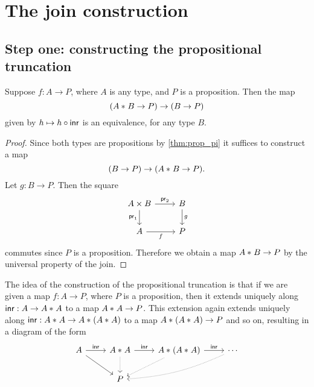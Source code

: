 \section{The join construction}
\subsection{Step one: constructing the propositional truncation}

\begin{lem}\label{lem:extend_join_prop}
Suppose $f:A\to P$, where $A$ is any type, and $P$ is a proposition.
Then the map
\begin{equation*}
({A}\ast_{}{B}\to P)\to (B\to P)
\end{equation*}
given by $h\mapsto h\circ {\mathsf{inr}}$ is an equivalence, for any type $B$.
\end{lem}

\begin{proof}
Since both types are propositions by \cref{thm:prop_pi} it suffices to construct a map
\begin{equation*}
(B\to P)\to ({A}\ast_{}{B}\to P).
\end{equation*}
Let $g:B\to P$. Then the square
\begin{equation*}
\begin{tikzcd}
A\times B \arrow[r,"\proj 2"] \arrow[d,swap,"\proj 1"] & B \arrow[d,"g"] \\
A \arrow[r,swap,"f"] & P
\end{tikzcd}
\end{equation*}
commutes since $P$ is a proposition. Therefore we obtain a map ${A}\ast_{}{B}\to P$ by the universal property of the join.
\end{proof}

The idea of the construction of the propositional truncation is that if we are given a map $f:A\to P$, where $P$ is a proposition, then it extends uniquely along ${\mathsf{inr}}:A\to {A}\ast_{}{A}$ to a map ${A}\ast_{}{A}\to P$. This extension again extends uniquely along ${\mathsf{inr}}:{A}\ast_{}{A}\to {A}\ast_{}{({A}\ast_{}{A})}$ to a map ${A}\ast_{}{({A}\ast_{}{A})}\to P$ and so on, resulting in a diagram of the form
\begin{equation*}
\begin{tikzcd}
A \arrow[dr] \arrow[r,"\inr"] & \join{A}{A} \arrow[d,densely dotted] \arrow[r,"\inr"] & \join{A}{(\join{A}{A})} \arrow[dl,densely dotted] \arrow[r,"\inr"] & \cdots \arrow[dll,densely dotted,bend left=10] \\
& P
\end{tikzcd}
\end{equation*}

